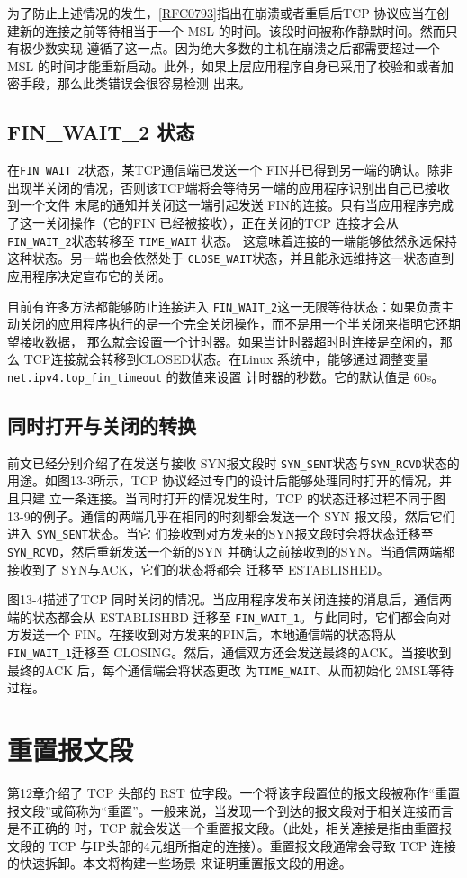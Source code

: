 为了防止上述情况的发生，\href{https://www.rfc-editor.org/rfc/rfc0793}{[RFC0793]}指出在崩溃或者重启后TCP
协议应当在创建新的连接之前等待相当于一个 MSL 的时间。该段时间被称作静默时间。然而只有极少数实现
遵循了这一点。因为绝大多数的主机在崩溃之后都需要超过一个 MSL
的时间才能重新启动。此外，如果上层应用程序自身已采用了校验和或者加密手段，那么此类错误会很容易检测
出来。
\subsection{ FIN\_WAIT\_2 状态}
在\verb|FIN_WAIT_2|状态，某TCP通信端已发送一个
FIN并已得到另一端的确认。除非出现半关闭的情况，否则该TCP端将会等待另一端的应用程序识别出自己已接收到一个文件
末尾的通知并关闭这一端引起发送 FIN的连接。只有当应用程序完成了这一关闭操作（它的FIN 已经被接收），正在关闭的TCP 连接才会从
\verb|FIN_WAIT_2|状态转移至 \verb|TIME_WAIT| 状态。
这意味着连接的一端能够依然永远保持这种状态。另一端也会依然处于 \verb|CLOSE_WAIT|状态，并且能永远维持这一状态直到应用程序决定宣布它的关闭。

目前有许多方法都能够防止连接进入
\verb|FIN_WAIT_2|这一无限等待状态：如果负责主动关闭的应用程序执行的是一个完全关闭操作，而不是用一个半关闭来指明它还期望接收数据，
那么就会设置一个计时器。如果当计时器超时时连接是空闲的，那么 TCP连接就会转移到CLOSED状态。在Linux 系统中，能够通过调整变量
\verb|net.ipv4.top_fin_timeout| 的数值来设置
计时器的秒数。它的默认值是 60s。
\subsection{同时打开与关闭的转换}
前文已经分别介绍了在发送与接收 SYN报文段时
\verb|SYN_SENT|状态与\verb|SYN_RCVD|状态的用途。如图13-3所示，TCP 协议经过专门的设计后能够处理同时打开的情况，并且只建
立一条连接。当同时打开的情况发生时，TCP 的状态迁移过程不同于图13-9的例子。通信的两端几乎在相同的时刻都会发送一个 SYN
报文段，然后它们进入 \verb|SYN_SENT|状态。当它
们接收到对方发来的SYN报文段时会将状态迁移至\verb|SYN_RCVD|，然后重新发送一个新的SYN
并确认之前接收到的SYN。当通信两端都接收到了 SYN与ACK，它们的状态将都会
迁移至 ESTABLISHED。

图13-4描述了TCP 同时关闭的情况。当应用程序发布关闭连接的消息后，通信两端的状态都会从 ESTABLISHBD 迁移至
\verb|FIN_WAIT_1|。与此同时，它们都会向对方发送一个
FIN。在接收到对方发来的FIN后，本地通信端的状态将从 \verb|FIN_WAIT_1|迁移至
CLOSING。然后，通信双方还会发送最终的ACK。当接收到最终的ACK 后，每个通信端会将状态更改
为\verb|TIME_WAIT|、从而初始化 2MSL等待过程。
\section{重置报文段}
第12章介绍了 TCP 头部的 RST
位字段。一个将该字段置位的报文段被称作“重置报文段”或简称为“重置”。一般来说，当发现一个到达的报文段对于相关连接而言是不正确的
时，TCP 就会发送一个重置报文段。（此处，相关達接是指由重置报文段的 TCP 与IP头部的4元组所指定的连接）。重置报文段通常会导致
TCP 连接的快速拆卸。本文将构建一些场景
来证明重置报文段的用途。
